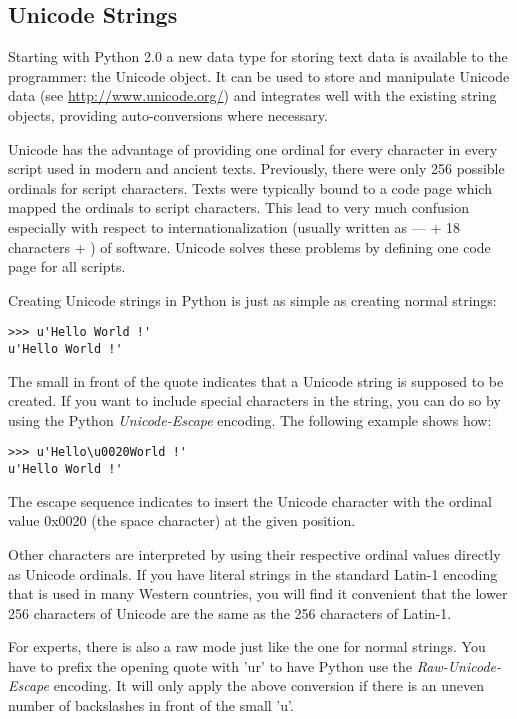 \documentclass{manual}
\begin{document}
\subsection{Unicode Strings \label{unicodeStrings}}

Starting with Python 2.0 a new data type for storing text data is
available to the programmer: the Unicode object. It can be used to
store and manipulate Unicode data (see \url{http://www.unicode.org/})
and integrates well with the existing string objects, providing
auto-conversions where necessary.

Unicode has the advantage of providing one ordinal for every character
in every script used in modern and ancient texts. Previously, there
were only 256 possible ordinals for script characters. Texts were
typically bound to a code page which mapped the ordinals to script
characters. This lead to very much confusion especially with respect
to internationalization (usually written as  ---
 + 18 characters + ) of software.  Unicode
solves these problems by defining one code page for all scripts.

Creating Unicode strings in Python is just as simple as creating
normal strings:

\begin{verbatim}
>>> u'Hello World !'
u'Hello World !'
\end{verbatim}

The small  in front of the quote indicates that a
Unicode string is supposed to be created. If you want to include
special characters in the string, you can do so by using the Python
\emph{Unicode-Escape} encoding. The following example shows how:

\begin{verbatim}
>>> u'Hello\u0020World !'
u'Hello World !'
\end{verbatim}

The escape sequence  indicates to insert the Unicode
character with the ordinal value 0x0020 (the space character) at the
given position.

Other characters are interpreted by using their respective ordinal
values directly as Unicode ordinals.  If you have literal strings
in the standard Latin-1 encoding that is used in many Western countries,
you will find it convenient that the lower 256 characters
of Unicode are the same as the 256 characters of Latin-1.

For experts, there is also a raw mode just like the one for normal
strings. You have to prefix the opening quote with 'ur' to have
Python use the \emph{Raw-Unicode-Escape} encoding. It will only apply
the above  conversion if there is an uneven number of
backslashes in front of the small 'u'.
\end{document}
